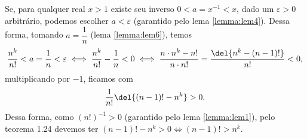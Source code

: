 \documentclass{IMTexam}
\newtheorem{lemma}[theorem]{Lema}
\begin{document}
\begin{questions}
\begin{solution}
			Se, para qualquer real $ x>1 $ existe seu inverso $ 0<a=x^{-1}<x $, dado um $ \varepsilon>0 $ arbitrário, podemos escolher $ a<\varepsilon $ (garantido pelo lema \ref{lemma:lem4}). Dessa forma, tomando $ a=\dfrac{1}{n} $ (lema \ref{lemma:lem6}), temos
			\[ \dfrac{n^{k}}{n!}<a=\dfrac{1}{n}<\varepsilon\iff \dfrac{n^{k}}{n!}-\dfrac{1}{n}<0\iff \dfrac{n\cdot n^{k}-n!}{n\cdot n!}=\dfrac{\del{n^{k}-(n-1)!}}{n!}<0, \]
			multiplicando por $ -1 $, ficamos com
			\[ \dfrac{1}{n!}\del{(n-1)!-n^{k}}>0 .\]
			Dessa forma, como $ (n!)^{-1}>0 $ (garantido pelo lema \ref{lemma:lem1}), pelo teorema 1.24 devemos ter $ (n-1)!-n^{k}>0\iff (n-1)!>n^{k} $.
			
%			
%			
%		
%		
%		

\end{solution}
\end{questions}
\end{document}
